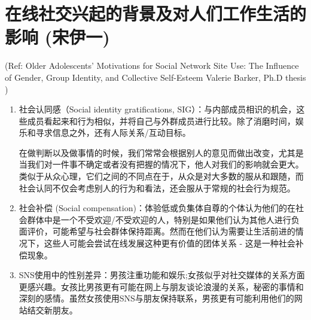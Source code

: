 
\color{olive}
\section{ 在线社交兴起的背景及对人们工作生活的影响  {(宋伊一)}
}

(Ref: Older Adolescents’ Motivations for Social Network Site Use: The Influence of Gender, Group Identity, and Collective Self-Esteem
Valerie Barker, Ph.D thesis )


\begin{enumerate}
\item 社会认同感（Social identity gratifications, SIG）：与内部成员相识的机会，这些成员看起来和行为相似，并将自己与外群成员进行比较。除了消磨时间，娱乐和寻求信息之外，还有人际关系/互动目标。

在做判断以及做事情的时候，我们常常会根据别人的意见而做出改变，尤其是当我们对一件事不确定或者没有把握的情况下，他人对我们的影响就会更大。类似于从众心理，它们之间的不同点在于，从众是对大多数的服从和跟随，而社会认同不仅会考虑别人的行为和看法，还会服从于常规的社会行为规范。


\item 
社会补偿 (Social compensation)：体验低或负集体自尊的个体认为他们的在社会群体中是一个不受欢迎/不受欢迎的人，特别是如果他们认为其他人进行负面评价，可能希望与社会群体保持距离。然而在他们认为需要让生活前进的情况下，这些人可能会尝试在线发展这种更有价值的团体关系 - 这是一种社会补偿现象。

\item %
SNS使用中的性别差异：男孩注重功能和娱乐;女孩似乎对社交媒体的关系方面更感兴趣。女孩比男孩更有可能在网上与朋友谈论浪漫的关系，秘密的事情和深刻的感情。虽然女孩使用SNS与朋友保持联系，男孩更有可能利用他们的网站结交新朋友。

\end{enumerate}

